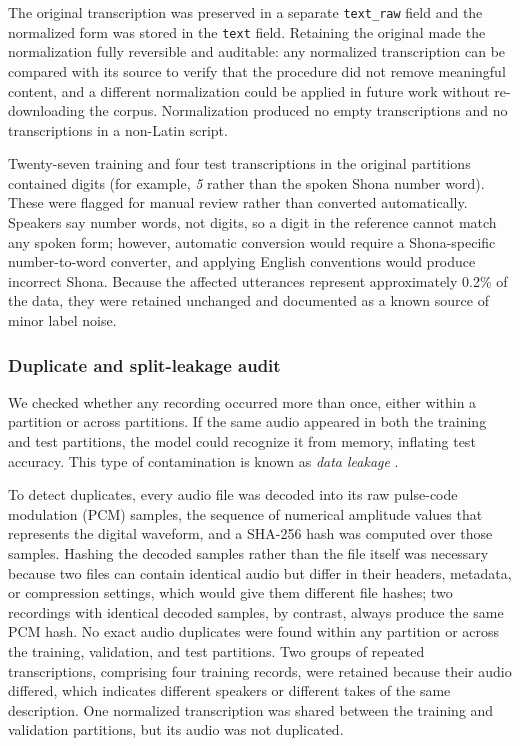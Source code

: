 The original transcription was preserved in a separate \texttt{text\_raw} field
and the normalized form was stored in the \texttt{text} field. Retaining the
original made the normalization fully reversible and auditable: any normalized
transcription can be compared with its source to verify that the procedure did
not remove meaningful content, and a different normalization could be applied in
future work without re-downloading the corpus. Normalization produced no empty
transcriptions and no transcriptions in a non-Latin script.

Twenty-seven training and four test transcriptions in the original partitions
contained digits (for example, \emph{5} rather than the spoken Shona number
word). These were flagged for manual review
rather than converted automatically. Speakers say number words, not digits, so a
digit in the reference cannot match any spoken form; however, automatic
conversion would require a Shona-specific number-to-word converter, and applying
English conventions would produce incorrect Shona. Because the affected
utterances represent approximately 0.2\% of the data, they were retained
unchanged and documented as a known source of minor label noise.

\subsubsection{Duplicate and split-leakage audit}
\label{sec:leakage}

We checked whether any recording occurred more than once, either within a
partition or across partitions. If the same audio appeared in both the training
and test partitions, the model could recognize it from memory, inflating test
accuracy. This type of contamination is known as \emph{data leakage}
\citep{Kaufman2012}.

To detect duplicates, every audio file was decoded into its raw pulse-code
modulation (PCM) samples, the sequence of numerical amplitude values that
represents the digital waveform, and a SHA-256 hash was computed over those
samples. Hashing the decoded samples rather than the file itself was necessary
because two files can contain identical audio but differ in their headers,
metadata, or compression settings, which would give them different file hashes;
two recordings with identical decoded samples, by contrast, always produce the
same PCM hash. No exact audio duplicates were found within any partition or
across the training, validation, and test partitions. Two groups of repeated
transcriptions, comprising four training records, were retained because their
audio differed, which indicates different speakers or different takes of the same
description. One normalized transcription was shared between the training and
validation partitions, but its audio was not duplicated.

